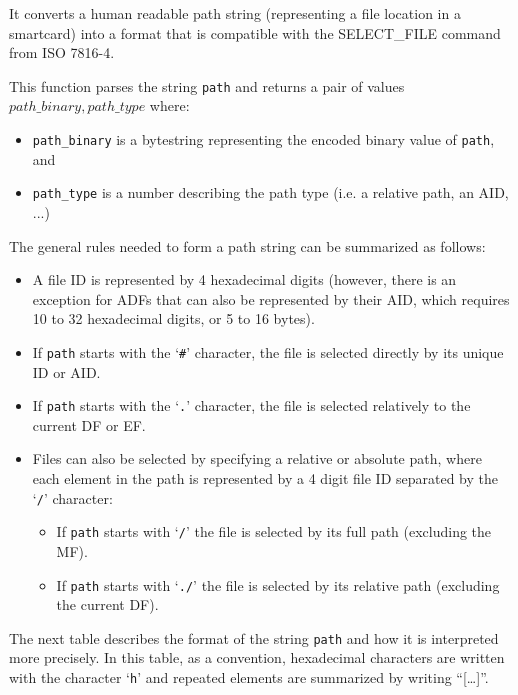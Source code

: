 \documentclass[11pt]{report}
\newcommand{\syn}[1]{\texttt{#1}}
\begin{document}
  It converts a human readable path string (representing a file location in
  a smartcard) into a format that is compatible with the SELECT\_FILE command from ISO 7816-4.

  This function parses the string \syn{path} and returns a pair of values $path\_binary, path\_type$ 
  where:
  \begin{itemize}
  \item{\syn{path\_binary} is a bytestring representing the encoded binary value of \syn{path}, and}
  \item{\syn{path\_type} is a number describing the path type (i.e. a relative path, an AID, ...)}
  \end{itemize}

  The general rules needed to form a path string can be summarized as follows:
  \begin{itemize}
  \item{A file ID is represented by 4 hexadecimal digits 
    (however, there is an exception for ADFs that can also be represented by their AID, 
     which requires 10 to 32 hexadecimal digits, or 5 to 16 bytes).}
  \item{If \syn{path} starts with the `\syn{\#}' character, the file is selected directly by its unique ID or AID.}
  \item{If \syn{path} starts with the `\syn{.}' character, the file is selected relatively to the current DF or EF.}
  \item{Files can also be selected by specifying a relative or absolute path, 
    where each element in the path is represented by a 4 digit file ID separated by the `\syn{/}' character:}
     \begin{itemize}
     \item{If \syn{path} starts with `\syn{/}' the file is selected by its full path (excluding the MF).}
     \item{If \syn{path} starts with `\syn{./}' the file is selected by its relative path (excluding the current DF).}
     \end{itemize}
  \end{itemize}

  The next table describes the format of the string \syn{path} and how it is interpreted more precisely. 
  In this table, as a convention, hexadecimal characters are written with the character `\texttt{h}' 
  and repeated elements are summarized by writing ``[\ldots ]''.
\end{document}
